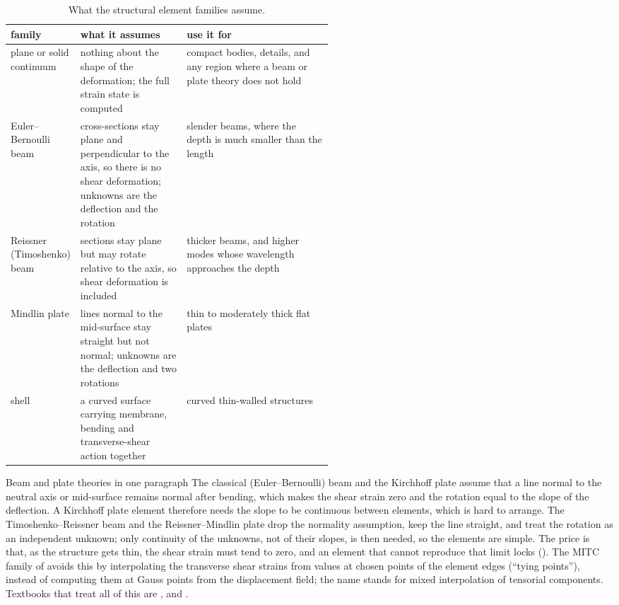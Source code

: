 \begin{table}[ht]
\centering\small
\begin{tabularx}{\linewidth}{@{}>{\raggedright\arraybackslash}p{0.2\linewidth} >{\raggedright\arraybackslash}p{0.33\linewidth} >{\raggedright\arraybackslash}X@{}}
\toprule
family & what it assumes & use it for \\
\midrule
plane or solid continuum & nothing about the shape of the deformation; the full strain state is computed & compact bodies, details, and any region where a beam or plate theory does not hold \\
Euler--Bernoulli beam & cross-sections stay plane and perpendicular to the axis, so there is no shear deformation; unknowns are the deflection and the rotation & slender beams, where the depth is much smaller than the length \\
Reissner (Timoshenko) beam & sections stay plane but may rotate relative to the axis, so shear deformation is included & thicker beams, and higher modes whose wavelength approaches the depth \\
Mindlin plate & lines normal to the mid-surface stay straight but not normal; unknowns are the deflection and two rotations & thin to moderately thick flat plates \\
shell & a curved surface carrying membrane, bending and transverse-shear action together & curved thin-walled structures \\
\bottomrule
\end{tabularx}
\caption{What the structural element families assume.}\label{tab:el-which}
\end{table}

\begin{sidenote}{Beam and plate theories in one paragraph}
The classical (Euler--Bernoulli) beam and the Kirchhoff plate assume that a line normal to the neutral axis or mid-surface remains normal after bending, which makes the shear strain zero and the rotation equal to the slope of the deflection. A Kirchhoff plate element therefore needs the slope to be continuous between elements, which is hard to arrange. The Timoshenko--Reissner beam and the Reissner--Mindlin plate drop the normality assumption, keep the line straight, and treat the rotation as an independent unknown; only continuity of the unknowns, not of their slopes, is then needed, so the elements are simple. The price is that, as the structure gets thin, the shear strain must tend to zero, and an element that cannot reproduce that limit locks (). The MITC family of \citet{dvorkin1984} avoids this by interpolating the transverse shear strains from values at chosen points of the element edges (``tying points''), instead of computing them at Gauss points from the displacement field; the name stands for mixed interpolation of tensorial components. Textbooks that treat all of this are \citet{zienkiewicz2013fem}, \citet{bathe2014fep} and \citet{cook2002}.
\end{sidenote}

